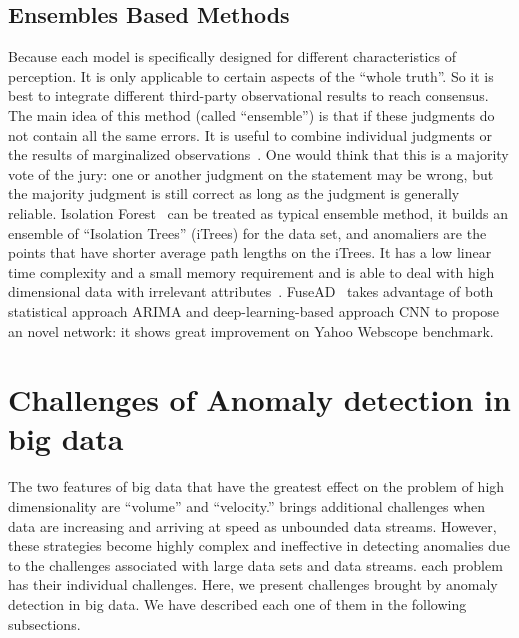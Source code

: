 \subsection{Ensembles Based Methods}

Because each model is specifically designed
for different characteristics of perception.
It is only applicable to certain aspects of
the ``whole truth''.
So it is best to integrate different
third-party observational results to reach consensus.
The main idea of this method (called ``ensemble'')
is that if these judgments do not contain
all the same errors.
It is useful to combine individual judgments or
the results of marginalized observations~\cite{zhou2012ensemble}.
One would think that this is a majority vote of
the jury:
one or another judgment on the statement may be wrong,
but the majority judgment is still correct as long as
the judgment is generally reliable.
Isolation Forest~\cite{liu2008isolation}
can be treated as typical ensemble method,
it builds an ensemble of “Isolation Trees” (iTrees) for
the data set,
and anomaliers are the points that
have shorter average path lengths on the iTrees.
It has a low linear time complexity and
a small memory requirement
and is able to deal with high dimensional data with irrelevant attributes~\cite{chandola2009anomaly}.
FuseAD~\cite{munir2019fusead}
takes advantage of both statistical approach ARIMA
and deep-learning-based approach
CNN to propose an novel network:
it shows great improvement on Yahoo Webscope benchmark.

\section{Challenges of Anomaly detection in big data}
\label{sec-challenge-big}
The two features of big data that have the greatest effect
on the problem of high dimensionality are “volume” and “velocity.”
brings
additional challenges when data are increasing and arriving at speed as unbounded data
streams.
However, these strategies become
highly complex and ineffective in detecting anomalies due to the challenges associated
with large data sets and data streams.
each problem has their individual challenges.
Here, we present challenges
brought by anomaly detection in  big data.
We have described each one of them in the following subsections.

